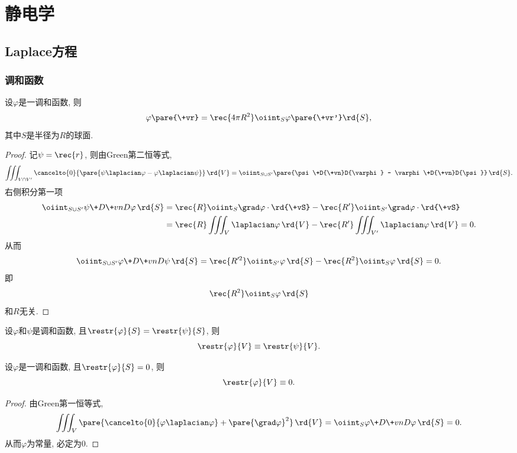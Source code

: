 \documentclass[hidelinks]{ctexart}
\begin{document}
\section{静电学} %
\label{sec:静电学}

\subsection{Laplace方程} %
\label{sub:laplace方程}

\subsubsection{调和函数} %
\label{ssub:调和函数}

\begin{theorem}[平均值定理]
    设$\varphi$是一调和函数, 则
    \[ \varphi\pare{\+vr} = \rec{4\pi R^2}\oiint_S \varphi\pare{\+vr'}\rd{S}, \]
    其中$S$是半径为$R$的球面.
\end{theorem}
\begin{proof}
    记$\displaystyle \psi = \rec{r}$, 则由Green第二恒等式,
    \[ \iiint_{V\cap V'} \cancelto{0}{\pare{\psi\laplacian \varphi - \varphi\laplacian \psi}}\,\rd{V} = \oiint_{S\cup S'} \pare{\psi\+D{\+vn}D{\varphi} - \varphi\+D{\+vn}D{\psi}}\,\rd{S}. \]
    右侧积分第一项
    \begin{align*}
        \oiint_{S\cup S'} \psi\+D{\+vn}D{\varphi}\,\rd{S} &= \rec{R} \oiint_{S} \grad\varphi\cdot\rd{\+vS} - \rec{R'} \oiint_{S'}\grad\varphi\cdot\rd{\+vS} \\ &= \rec{R} \iiint_{V} \laplacian \varphi\,\rd{V} - \rec{R'} \iiint_{V'} \laplacian \varphi\,\rd{V} = 0. 
    \end{align*}
    从而
    \[ \oiint_{S\cup S'} \varphi\+D{\+vn}D{\psi}\,\rd{S} = \rec{R'^2} \oiint_{S'}\varphi\,\rd{S} - \rec{R^2}\oiint_{S} \varphi\,\rd{S} = 0. \]
    即
    \[ \rec{R^2}\oiint_{S} \varphi\,\rd{S} \]
    和$R$无关.
\end{proof}
\begin{theorem}[唯一性定理]
    设$\varphi$和$\psi$是调和函数, 且$\restr{\varphi}{S} = \restr{\psi}{S}$, 则
    \[ \restr{\varphi}{V} \equiv \restr{\psi}{V}. \]
\end{theorem}
\begin{lemma}
    设$\varphi$是一调和函数, 且$\restr{\varphi}{S} = 0$, 则
    \[ \restr{\varphi}{V} \equiv 0. \]
\end{lemma}
\begin{proof}
    由Green第一恒等式,
    \[ \iiint_V \pare{\cancelto{0}{\varphi\laplacian \varphi} + \pare{\grad\varphi}^2}\,\rd{V} = \oiint_{S} {\varphi\+D{\+vn}D{\varphi}}\,\rd{S} = 0. \]
    从而$\varphi$为常量, 必定为$0$.
\end{proof}
\end{document}
